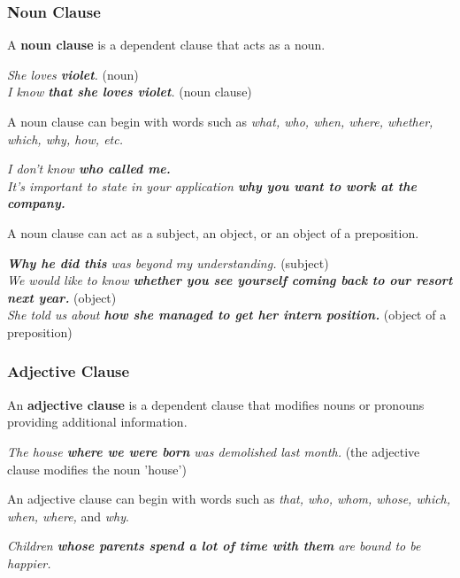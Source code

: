 \documentclass[hidelinks,10pt,a4paper]{article}
\begin{document}
\subsubsection{Noun Clause}
A \textbf{noun clause} is a dependent clause that acts as a noun.

\begin{center}
	\textit{She loves \textbf{violet}.} (noun)\\
	\textit{I know \textbf{that she loves violet}.} (noun clause)
\end{center}

A noun clause can begin with words such as \textit{what, who, when, where, whether, which, why, how, etc.}

\begin{center}
	\textit{I don't know \textbf{who called me.}} \\
	\textit{It's important to state in your application \textbf{why you want to work at the company.} }
\end{center}

A noun clause can act as a subject, an object, or an object of a preposition.

\begin{center}
	\textit{\textbf{Why he did this} was beyond my understanding.} (subject)\\
	\textit{We would like to know \textbf{whether you see yourself coming back to our resort next year.}} (object)\\
	\textit{She told us about \textbf{how she managed to get her intern position.}} (object of a preposition)
\end{center}


\subsubsection{Adjective Clause}
An \textbf{adjective clause} is a dependent clause that modifies nouns or pronouns providing additional information.

\begin{center}
	\textit{The house \textbf{where we were born} was demolished last month.} (the adjective clause modifies the noun 'house')
\end{center}

An adjective clause can begin with words such as \textit{that, who, whom, whose, which, when, where,} and \textit{why}.

\begin{center}
	\textit{Children \textbf{whose parents spend a lot of time with them} are bound to be happier.}
\end{center}
\end{document}
